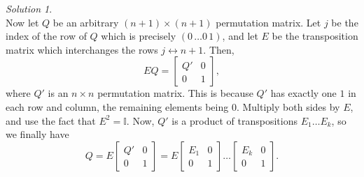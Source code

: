 \documentclass[11pt]{report}
\theoremstyle{remark}
\newtheorem*{solution}{Solution}
\begin{document}
\begin{solution}
\[        \] Now let $Q$ be an arbitrary $(n + 1)\times(n + 1)$ permutation matrix.
        Let $j$ be the index of the row of $Q$ which is precisely $(0\, \dots 0\,
        1)$, and let $E$ be the transposition matrix which interchanges the rows $j
        \leftrightarrow n + 1$. Then, \[
            EQ = \begin{bmatrix}
                Q' & 0 \\
                0  & 1
            \end{bmatrix},
        \] where $Q'$ is an $n \times n$ permutation matrix. This is because $Q'$
        has exactly one $1$ in each row and column, the remaining elements being
        $0$. Multiply both sides by $E$, and use the fact that $E^2 = \mathbb{I}$.
        Now, $Q'$ is a product of transpositions $E_1\dots E_k$, so we finally have
        \[
            Q = E
            \begin{bmatrix}
                Q' & 0 \\
                0  & 1
            \end{bmatrix} = E
            \begin{bmatrix}
                E_1 & 0 \\
                0   & 1
            \end{bmatrix}
            \dots
            \begin{bmatrix}
                E_k & 0 \\
                0   & 1
            \end{bmatrix}.
        \] 
    \end{solution}
\end{document}
